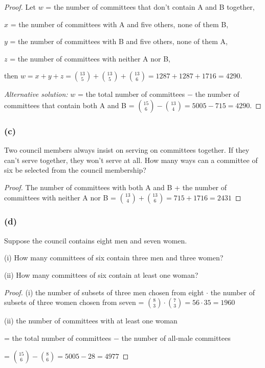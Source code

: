 \documentclass[14pt]{extarticle}
\begin{document}
\begin{proof}
     Let \(w\) = the number of committees that don’t contain A and B together,

     \(x\) = the number of committees with A and five others, none of them B,

     \(y\) = the number of committees with B and five others, none of them A,

     \(z\) = the number of committees with neither A nor B,

     then \(w = x+y+z = \binom{13}{5} + \binom{13}{5} + \binom{13}{6} = 1287+1287+1716 = 4290\).

          {\it Alternative solution:} \(w\) = the total number of committees \(-\) the number of committees that contain both
     A and B = \(\binom{15}{6} - \binom{13}{4} = 5005 - 715 = 4290.\)
\end{proof}

\subsubsection{(c)}
Two council members always insist on serving on committees together. If they can’t serve together, they won’t serve at
all. How many ways can a committee of six be selected from the council membership?

\begin{proof}
     The number of committees with both A and B + the number of committees with neither A nor B = \(\binom{13}{4} +
     \binom{13}{6} = 715 + 1716 = 2431\)
\end{proof}

\subsubsection{(d)}
Suppose the council contains eight men and seven women.

(i) How many committees of six contain three men and three women?

(ii) How many committees of six contain at least one woman?

\begin{proof}
     (i) the number of subsets of three men chosen from eight \(\cdot\) the number of subsets of three women chosen from
     seven = \(\binom{8}{3} \cdot \binom{7}{3} = 56 \cdot 35 = 1960\)

     (ii) the number of committees with at least one woman

     = the total number of committees \(-\) the number of all-male committees

     = \(\binom{15}{6} - \binom{8}{6} = 5005 - 28 = 4977\)
\end{proof}
\end{document}
